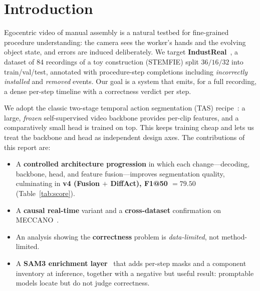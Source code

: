 \documentclass[11pt]{article}
\newcommand{\best}[1]{\textcolor{best}{\textbf{#1}}}
\begin{document}
\section{Introduction}
Egocentric video of manual assembly is a natural testbed for fine-grained procedure understanding: the camera
sees the worker's hands and the evolving object state, and errors are induced deliberately. We target
\textbf{IndustReal}~\cite{industreal}, a dataset of $84$ recordings of a toy construction (STEMFIE) split
$36/16/32$ into train/val/test, annotated with procedure-step completions including \emph{incorrectly installed}
and \emph{removed} events. Our goal is a system that emits, for a full recording, a dense per-step timeline with
a correctness verdict per step.

We adopt the classic two-stage temporal action segmentation (TAS) recipe~\cite{mstcn,asformer}: a large,
\emph{frozen} self-supervised video backbone provides per-clip features, and a comparatively small head is trained
on top. This keeps training cheap and lets us treat the backbone and head as independent design axes. The
contributions of this report are:
\begin{itemize}
  \item A \textbf{controlled architecture progression} in which each change---decoding, backbone, head, and
  feature fusion---improves segmentation quality, culminating in \best{v4 (Fusion $+$ DiffAct), F1@50 $=79.50$}
  (Table~\ref{tab:score}).
  \item A \textbf{causal real-time} variant and a \textbf{cross-dataset} confirmation on MECCANO~\cite{meccano}.
  \item An analysis showing the \textbf{correctness} problem is \emph{data-limited}, not method-limited.
  \item A \textbf{SAM3 enrichment layer}~\cite{sam3} that adds per-step masks and a component inventory at inference,
  together with a negative but useful result: promptable models locate but do not judge correctness.
\end{itemize}
\end{document}
